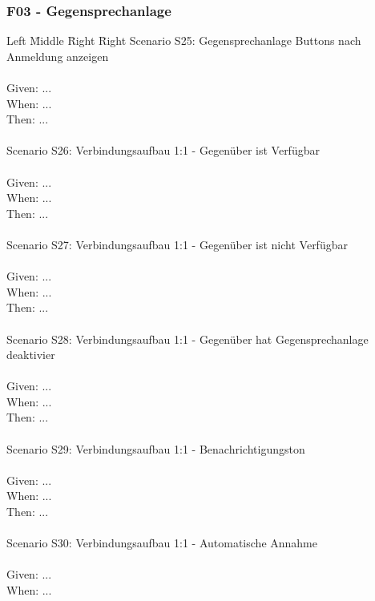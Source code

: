 \subsubsection*{F03 - Gegensprechanlage}
\begin{tabbing}
    Left \= Middle \= Right \= Right \kill
    Scenario S25: \> \> \> Gegensprechanlage Buttons nach Anmeldung anzeigen \\ \\
    Given:  \> \> \> ...\\
    When:   \> \> \> ...\\
    Then:   \> \> \> ...\\
    \\
    Scenario S26: \> \> \> Verbindungsaufbau 1:1 - Gegenüber ist Verfügbar \\ \\
    Given:  \> \> \> ...\\
    When:   \> \> \> ...\\
    Then:   \> \> \> ...\\
    \\
    Scenario S27: \> \> \> Verbindungsaufbau 1:1 - Gegenüber ist nicht Verfügbar \\ \\
    Given:  \> \> \> ...\\
    When:   \> \> \> ...\\
    Then:   \> \> \> ...\\
    \\
    Scenario S28: \> \> \> Verbindungsaufbau 1:1 - Gegenüber hat Gegensprechanlage deaktivier \\ \\
    Given:  \> \> \> ...\\
    When:   \> \> \> ...\\
    Then:   \> \> \> ...\\
    \\
    Scenario S29: \> \> \> Verbindungsaufbau 1:1 - Benachrichtigungston \\ \\
    Given:  \> \> \> ...\\
    When:   \> \> \> ...\\
    Then:   \> \> \> ...\\
    \\
    Scenario S30: \> \> \> Verbindungsaufbau 1:1 - Automatische Annahme \\ \\
    Given:  \> \> \> ...\\
    When:   \> \> \> ...\\

\end{tabbing}
